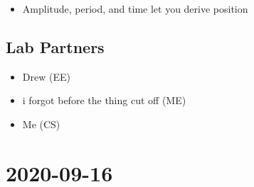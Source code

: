 \begin{itemize}
    \item Amplitude, period, and time let you derive position
\end{itemize}

\subsection{Lab Partners}

\begin{itemize}
    \item Drew (EE)
    \item i forgot before the thing cut off (ME)
    \item Me (CS)
\end{itemize}

\section{2020-09-16}